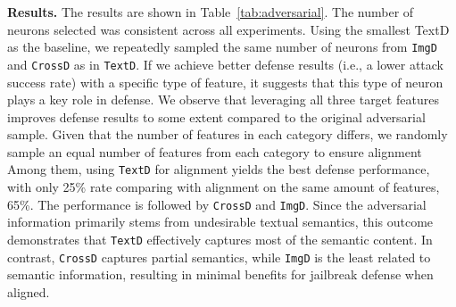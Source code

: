 \textbf{Results.} The results are shown in Table~\ref{tab:adversarial}. The number of neurons selected was consistent across all experiments. Using the smallest TextD as the baseline, we repeatedly sampled the same number of neurons from \texttt{ImgD} and \texttt{CrossD} as in \texttt{TextD}. If we achieve better defense results (i.e., a lower attack success rate) with a specific type of feature, it suggests that this type of neuron plays a key role in defense. 
 We observe that leveraging all three target features improves defense results to some extent compared to the original adversarial sample. Given that the number of features in each category differs, we randomly sample an equal number of features from each category to ensure alignment Among them, using \texttt{TextD} for alignment yields the best defense performance, with only 25\% rate comparing with alignment on the same amount of features, 65\%. The performance is followed by \texttt{CrossD} and \texttt{ImgD}. Since the adversarial information primarily stems from undesirable textual semantics, this outcome demonstrates that \texttt{TextD} effectively captures most of the semantic content. In contrast, \texttt{CrossD} captures partial semantics, while \texttt{ImgD} is the least related to semantic information, resulting in minimal benefits for jailbreak defense when aligned.
\begin{table}[h]
    \centering
    \caption{Success rate for adversarial attacks with different target features involved in the alignment training.  The success rate of the benign image is 10\%, for the original adversarial sample is 80\%. For comparison, we also compare with the performance of aligning with the same number of randomly selected features, 65\%.}
    \label{tab:adversarial}
\end{table}
\vspace{-8mm}
